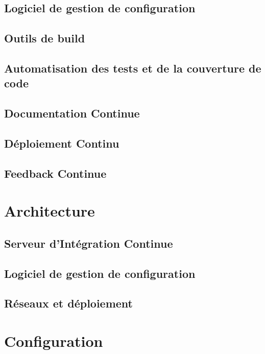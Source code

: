 \documentclass{report}
\begin{document}
        \subsection{Logiciel de gestion de configuration}

        \subsection{Outils de build}

        \subsection{Automatisation des tests et de la couverture de code}

        \subsection{Documentation Continue}

        \subsection{Déploiement Continu}

        \subsection{Feedback Continue}

      \section{Architecture}

        \subsection{Serveur d’Intégration Continue}

        \subsection{Logiciel de gestion de configuration}

        \subsection{Réseaux et déploiement}

      \section{Configuration}
\end{document}
